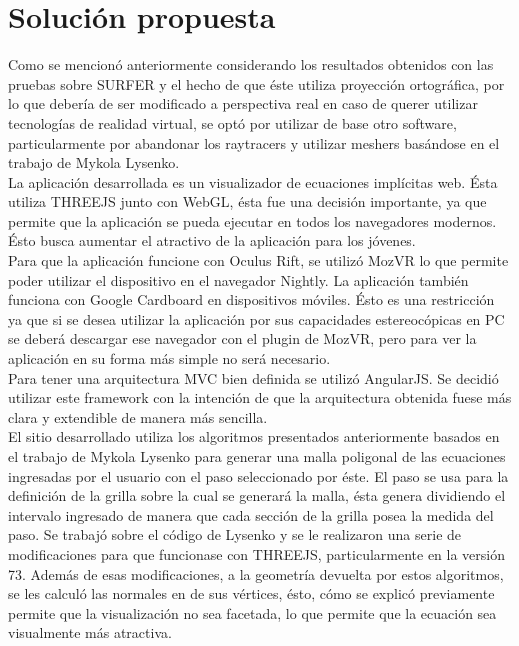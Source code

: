\documentclass[12pt]{article}
\begin{document}
\section{Solución propuesta}
Como se mencionó anteriormente considerando los resultados obtenidos con las pruebas sobre SURFER  y el hecho de que éste utiliza proyección ortográfica, por lo que debería de ser modificado a perspectiva real en caso de querer utilizar tecnologías de realidad virtual, se optó por utilizar de base otro software, particularmente por abandonar los raytracers y utilizar meshers basándose en el trabajo de Mykola Lysenko.
\\La aplicación desarrollada es un visualizador de ecuaciones implícitas web. Ésta utiliza THREEJS junto con WebGL, ésta fue una decisión importante, ya que permite que la aplicación se pueda ejecutar en todos los navegadores modernos. Ésto busca  aumentar el atractivo de la aplicación para los jóvenes.
\\Para que la aplicación funcione con Oculus Rift, se utilizó MozVR lo que permite poder utilizar el dispositivo en el navegador Nightly. La aplicación también funciona con Google Cardboard en dispositivos móviles. Ésto es una restricción ya que si se desea utilizar la aplicación por sus capacidades estereocópicas en PC se deberá descargar ese navegador con el plugin de MozVR, pero para ver la aplicación en su forma más simple no será necesario.
\\ Para tener una arquitectura MVC bien definida se utilizó AngularJS. Se decidió utilizar este framework con la intención de que la arquitectura obtenida fuese más clara y extendible de manera más sencilla.
\\El sitio desarrollado utiliza los algoritmos presentados anteriormente basados en el trabajo de Mykola Lysenko\cite{mykola1}\cite{mykola2} para generar una malla poligonal de las ecuaciones ingresadas por el usuario con el paso seleccionado por éste. El paso se usa para la definición de la grilla sobre la cual se generará la malla, ésta genera dividiendo el intervalo ingresado de manera que cada sección de la grilla posea la medida del paso. Se trabajó sobre el código de Lysenko y se le realizaron una serie de modificaciones para que funcionase con THREEJS, particularmente en la versión 73. Además de esas modificaciones, a la geometría devuelta por estos algoritmos, se les calculó las normales en de sus vértices, ésto, cómo se explicó previamente permite que la visualización no sea facetada, lo que permite que la ecuación sea visualmente más atractiva. 
\end{document}
